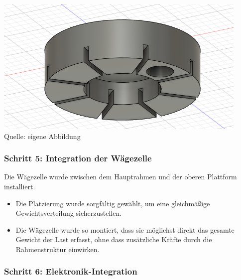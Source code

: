 \documentclass[ngerman,12pt,a4paper]{article}
\begin{document}
\begin{center}
\begin{minipage}{0.4\linewidth}
		\end{minipage}
		\hfill 
		\begin{minipage}{0.4\linewidth}
			\centering
			\includegraphics{Pictures/Verbindungselement-3}
			\label{fig:Verbindungselement-3}
			\small Quelle: eigene Abbildung
		\end{minipage}
	\end{center} 
	
	 \subsubsection*{Schritt 5: Integration der Wägezelle}
	 
	 Die Wägezelle wurde zwischen dem Hauptrahmen und der oberen Plattform installiert.
	 \begin{itemize}
	 	\item Die Platzierung wurde sorgfältig gewählt, um eine gleichmäßige Gewichtsverteilung sicherzustellen.
	 	\item Die Wägezelle wurde so montiert, dass sie möglichst direkt das gesamte Gewicht der Last erfasst, ohne dass zusätzliche Kräfte durch die Rahmenstruktur einwirken.
	 \end{itemize}

	 \subsubsection*{Schritt 6: Elektronik-Integration}
	 
\end{document}
